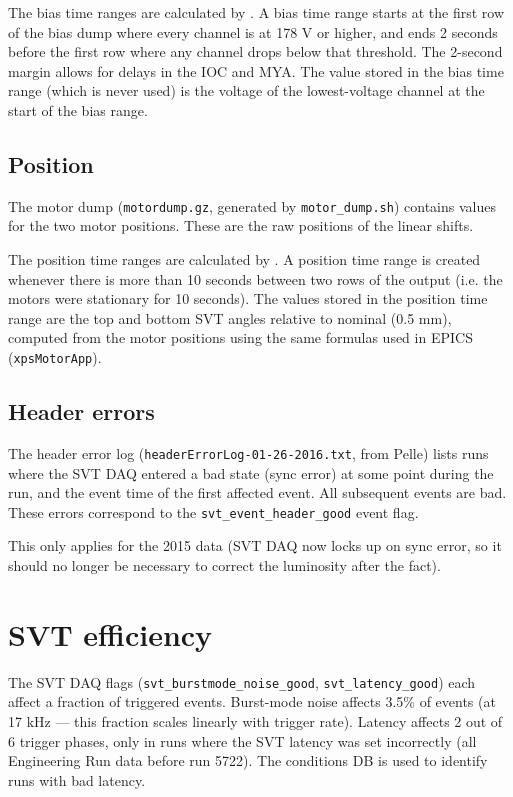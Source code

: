 \documentclass[aps,amsmath,amssymb,notitlepage,10pt,onecolumn]{revtex4-1}
\begin{document}
The bias time ranges are calculated by .
A bias time range starts at the first row of the bias dump where every channel is at 178 V or higher, and ends 2 seconds before the first row where any channel drops below that threshold.
The 2-second margin allows for delays in the IOC and MYA.
The value stored in the bias time range (which is never used) is the voltage of the lowest-voltage channel at the start of the bias range.

\subsection{Position}
The motor dump (\texttt{motordump.gz}, generated by \texttt{motor\_dump.sh}) contains values for the two motor positions.
These are the raw positions of the linear shifts.

The position time ranges are calculated by .
A position time range is created whenever there is more than 10 seconds between two rows of the output (i.e. the motors were stationary for 10 seconds).
The values stored in the position time range are the top and bottom SVT angles relative to nominal (0.5 mm), computed from the motor positions using the same formulas used in EPICS (\texttt{xpsMotorApp}).

\subsection{Header errors}
The header error log (\texttt{headerErrorLog-01-26-2016.txt}, from Pelle) lists runs where the SVT DAQ entered a bad state (sync error) at some point during the run, and the event time of the first affected event.
All subsequent events are bad.
These errors correspond to the \texttt{svt\_event\_header\_good} event flag.

This only applies for the 2015 data (SVT DAQ now locks up on sync error, so it should no longer be necessary to correct the luminosity after the fact).

\section{SVT efficiency}
The SVT DAQ flags (\texttt{svt\_burstmode\_noise\_good}, \texttt{svt\_latency\_good}) each affect a fraction of triggered events. Burst-mode noise affects 3.5\% of events (at 17 kHz --- this fraction scales linearly with trigger rate).
Latency affects 2 out of 6 trigger phases, only in runs where the SVT latency was set incorrectly (all Engineering Run data before run 5722). The conditions DB is used to identify runs with bad latency.
\end{document}
